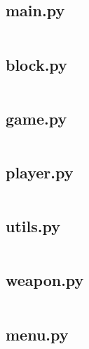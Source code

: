 \subsection{main.py}

\inputminted[breaklines, tabsize=2, fontsize=\footnotesize]{py}{Code/main.py}

\clearpage

\subsection{block.py}

\inputminted[breaklines, tabsize=2, fontsize=\footnotesize]{py}{Code/block.py}


\clearpage


\subsection{game.py}

\inputminted[breaklines, tabsize=2, fontsize=\footnotesize]{py}{Code/game.py}


\clearpage


\subsection{player.py}

\inputminted[breaklines, tabsize=2, fontsize=\footnotesize]{py}{Code/old_player.py}

\clearpage

\subsection{utils.py}

\inputminted[breaklines, tabsize=2, fontsize=\footnotesize]{py}{Code/old_utils.py}

\clearpage

\subsection{weapon.py}

\inputminted[breaklines, tabsize=2, fontsize=\footnotesize]{py}{Code/weapon.py}

\clearpage

\subsection{menu.py}

